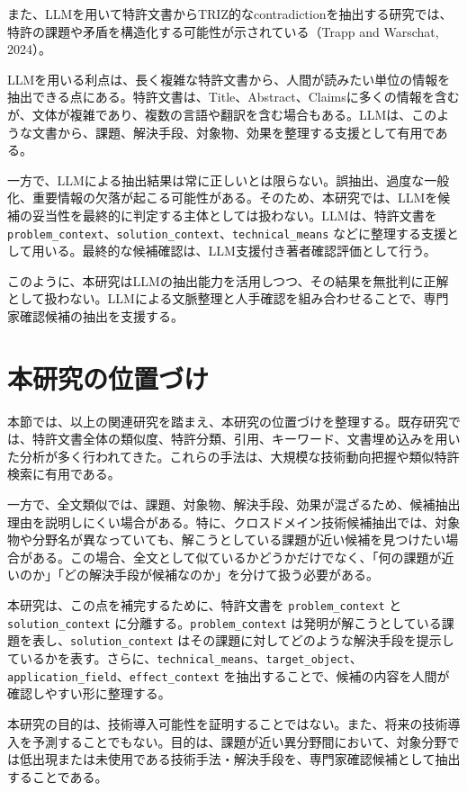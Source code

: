 また、LLMを用いて特許文書からTRIZ的なcontradictionを抽出する研究では、特許の課題や矛盾を構造化する可能性が示されている（Trapp and Warschat, 2024）。

LLMを用いる利点は、長く複雑な特許文書から、人間が読みたい単位の情報を抽出できる点にある。特許文書は、Title、Abstract、Claimsに多くの情報を含むが、文体が複雑であり、複数の言語や翻訳を含む場合もある。LLMは、このような文書から、課題、解決手段、対象物、効果を整理する支援として有用である。

一方で、LLMによる抽出結果は常に正しいとは限らない。誤抽出、過度な一般化、重要情報の欠落が起こる可能性がある。そのため、本研究では、LLMを候補の妥当性を最終的に判定する主体としては扱わない。LLMは、特許文書を \texttt{problem\_context}、\texttt{solution\_context}、\texttt{technical\_means} などに整理する支援として用いる。最終的な候補確認は、LLM支援付き著者確認評価として行う。

このように、本研究はLLMの抽出能力を活用しつつ、その結果を無批判に正解として扱わない。LLMによる文脈整理と人手確認を組み合わせることで、専門家確認候補の抽出を支援する。

\section{本研究の位置づけ}

本節では、以上の関連研究を踏まえ、本研究の位置づけを整理する。既存研究では、特許文書全体の類似度、特許分類、引用、キーワード、文書埋め込みを用いた分析が多く行われてきた。これらの手法は、大規模な技術動向把握や類似特許検索に有用である。

一方で、全文類似では、課題、対象物、解決手段、効果が混ざるため、候補抽出理由を説明しにくい場合がある。特に、クロスドメイン技術候補抽出では、対象物や分野名が異なっていても、解こうとしている課題が近い候補を見つけたい場合がある。この場合、全文として似ているかどうかだけでなく、「何の課題が近いのか」「どの解決手段が候補なのか」を分けて扱う必要がある。

本研究は、この点を補完するために、特許文書を \texttt{problem\_context} と \texttt{solution\_context} に分離する。\texttt{problem\_context} は発明が解こうとしている課題を表し、\texttt{solution\_context} はその課題に対してどのような解決手段を提示しているかを表す。さらに、\texttt{technical\_means}、\texttt{target\_object}、\texttt{application\_field}、\texttt{effect\_context} を抽出することで、候補の内容を人間が確認しやすい形に整理する。

本研究の目的は、技術導入可能性を証明することではない。また、将来の技術導入を予測することでもない。目的は、課題が近い異分野間において、対象分野では低出現または未使用である技術手法・解決手段を、専門家確認候補として抽出することである。

